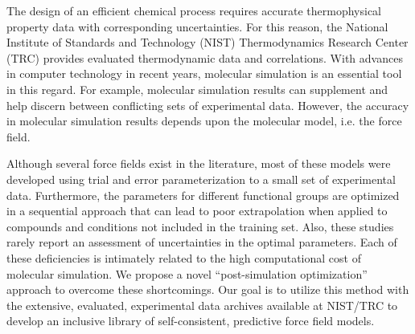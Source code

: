 \documentclass[12pt]{article}
\begin{document}
The design of an efficient chemical process requires accurate thermophysical property data with corresponding uncertainties. For this reason, the National Institute of Standards and Technology (NIST) Thermodynamics Research Center (TRC) provides evaluated thermodynamic data and correlations. With advances in computer technology in recent years, molecular simulation is an essential tool in this regard. For example, molecular simulation results can supplement and help discern between conflicting sets of experimental data. However, the accuracy in molecular simulation results depends upon the molecular model, i.e. the force field.

Although several force fields exist in the literature, most of these models were developed using trial and error parameterization to a small set of experimental data. Furthermore, the parameters for different functional groups are optimized in a sequential approach that can lead to poor extrapolation when applied to compounds and conditions not included in the training set. Also, these studies rarely report an assessment of uncertainties in the optimal parameters. Each of these deficiencies is intimately related to the high computational cost of molecular simulation. We propose a novel ``post-simulation optimization'' approach to overcome these shortcomings. Our goal is to utilize this method with the extensive, evaluated, experimental data archives available at NIST/TRC to develop an inclusive library of self-consistent, predictive force field models.
\end{document}
